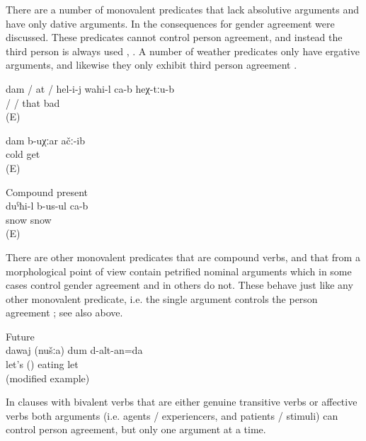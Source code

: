 There are a number of monovalent predicates that lack absolutive arguments and have only dative arguments. In  the consequences for gender agreement were discussed. These predicates cannot control person agreement, and instead the third person is always used , . A number of weather predicates only have ergative arguments, and likewise they only exhibit third person agreement .
%
\begin{exe}
	\ex	\label{ex:I / you / she /	he feel(s) bad there}
	\gll	dam	/	at	/ hel-i-j	wahi-l	ca-b	heχ-tːu-b\\
			/		/	that	bad		\\
	\glt	{} (E)

	\ex	\label{ex:‎‎‎I got cold agreement}
	\gll	dam	b-uχːar	ačː-ib\\
			cold	get\\
	\glt	{} (E)

	\ex	Compound present\\	\label{ex:It is snowing compound present}
	\gll	duˁħi-l	b-us-ul	ca-b\\
		snow	snow	\\
	\glt	{} (E)
\end{exe}

There are other monovalent predicates that are compound verbs, and that from a morphological point of view contain petrified nominal arguments which in some cases control gender agreement and in others do not. These behave just like any other monovalent predicate, i.e. the single argument controls the person agreement ; see also  above.
%
\begin{exe}
	\ex	Future\\	\label{ex:‎‎Come on, we will eat future}
	\gll	dawaj		(nušːa)	dum	d-alt-an=da\\
		let's		()	eating	let\\
	\glt	{} (modified example)
\end{exe}

In clauses with bivalent verbs that are either genuine transitive verbs or affective verbs both arguments (i.e. agents / experiencers, and patients / stimuli) can control person agreement, but only one argument at a time. 

